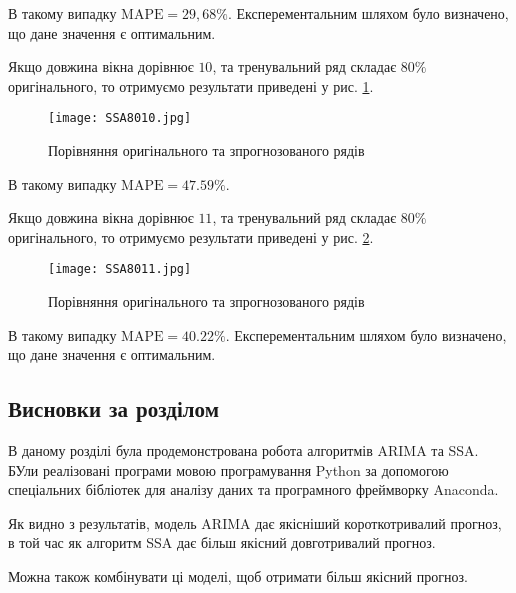 В такому випадку $\text{MAPE} = 29,68\%$. Експерементальним шляхом було визначено, що дане значення є оптимальним.

Якщо довжина вікна дорівнює $10$, та тренувальний ряд складає $80\%$ оригінального, то отримуємо результати приведені у рис. \ref{fig:SSA8010}.

\newpage

\vspace{1em}

\begin{figure}[h]
  \texttt{[image: SSA8010.jpg]}
  \caption{Порівняння оригінального та зпрогнозованого рядів}
  \label{fig:SSA8010}
\end{figure}

В такому випадку $\text{MAPE} = 47.59\%$.

Якщо довжина вікна дорівнює $11$, та тренувальний ряд складає $80\%$ оригінального, то отримуємо результати приведені у рис. \ref{fig:SSA8011}.

\begin{figure}[h]
  \texttt{[image: SSA8011.jpg]}
  \caption{Порівняння оригінального та зпрогнозованого рядів}
  \label{fig:SSA8011}
\end{figure}

В такому випадку $\text{MAPE} = 40.22\%$. Експерементальним шляхом було визначено, що дане значення є оптимальним.

\subsection{Висновки за розділом}

В даному розділі була продемонстрована робота алгоритмів ARIMA та SSA. БУли реалізовані програми мовою програмування Python за допомогою спеціальних бібліотек для аналізу даних та програмного фреймворку Anaconda. 

Як видно з результатів, модель ARIMA дає якісніший короткотривалий прогноз, в той час як алгоритм SSA дає більш якісний довготривалий прогноз.

Можна також комбінувати ці моделі, щоб отримати більш якісний прогноз.
